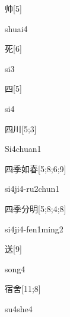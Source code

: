 \begin{verbete}[shuai4]{帅}[5]
\begin{pronuncia}{shuai4}
\end{pronuncia}
\end{verbete}

\begin{verbete}[si3]{死}[6]
\begin{pronuncia}{si3}
\end{pronuncia}
\end{verbete}

\begin{verbete}[si4]{四}[5]
\begin{pronuncia}{si4}
\end{pronuncia}
\end{verbete}

\begin{verbete}[Si4chuan1]{四川}[5;3]
\begin{pronuncia}{Si4chuan1}
\end{pronuncia}
\end{verbete}

\begin{verbete}[si4ji4-ru2chun1]{四季如春}[5;8;6;9]
\begin{pronuncia}[\\]{si4ji4-ru2chun1}
\end{pronuncia}
\end{verbete}

\begin{verbete}{四季分明}[5;8;4;8]
\begin{pronuncia}[\\]{si4ji4-fen1ming2}
\end{pronuncia}
\end{verbete}

\begin{verbete}[song4]{送}[9]
\begin{pronuncia}{song4}
\end{pronuncia}
\end{verbete}

\begin{verbete}[su4she4]{宿舍}[11;8]
\begin{pronuncia}{su4she4}
\end{pronuncia}
\end{verbete}

